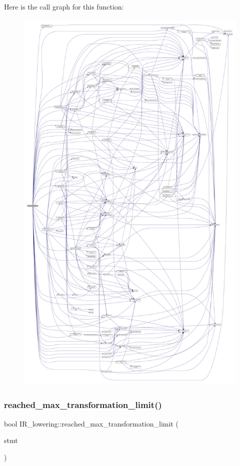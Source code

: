 Here is the call graph for this function\+:
\nopagebreak
\begin{figure}[H]
\begin{center}
\leavevmode
\includegraphics[height=550pt]{df/d7d/classIR__lowering_a96415d3fb04f24946a5fb657db8a8e22_cgraph}
\end{center}
\end{figure}
\mbox{\label{classIR__lowering_a1c9f8a152838d5330a866220393119ff}} 
\subsubsection{\texorpdfstring{reached\+\_\+max\+\_\+transformation\+\_\+limit()}{reached\_max\_transformation\_limit()}}
{\footnotesize\ttfamily bool I\+R\+\_\+lowering\+::reached\+\_\+max\+\_\+transformation\+\_\+limit (\begin{DoxyParamCaption}\item[{\hyperlink{tree__node_8hpp_a6ee377554d1c4871ad66a337eaa67fd5}{tree\+\_\+node\+Ref}}]{stmt }\end{DoxyParamCaption})\hspace{0.3cm}{\ttfamily [private]}}



